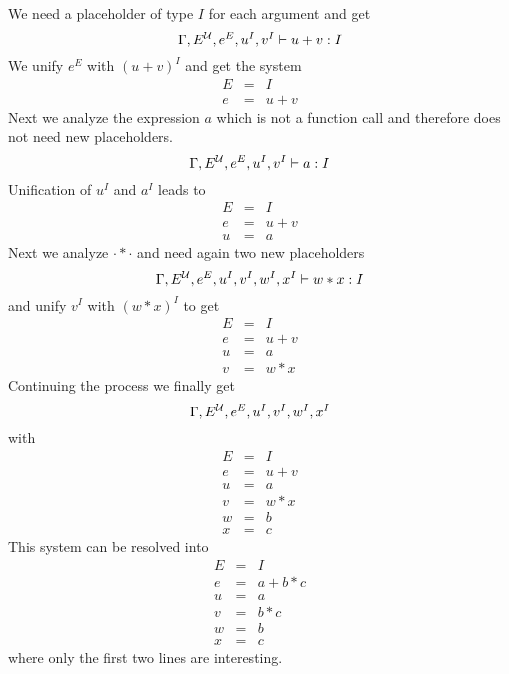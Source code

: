 We need a placeholder of type $I$ for each argument and get
$$
%
\Gamma,  E^\Any, e^E, u^I, v^I \vdash u + v: I
$$
%
We unify $e^E$ with $(u+v)^I$ and get the system
$$
%
\begin{array}{lll}
  E &=& I
  \\
  e &=& u + v
\end{array}
$$
%
Next we analyze the expression $a$ which is not a function call and therefore
does not need new placeholders.
$$
%
\Gamma,  E^\Any, e^E, u^I, v^I \vdash a:I
$$
%
Unification of $u^I$ and $a^I$ leads to
$$
%
\begin{array}{lll}
  E &=& I
  \\
  e &=& u + v
  \\
  u &=& a
\end{array}
$$
%
Next we analyze $\cdot * \cdot$ and need again two new placeholders
$$
%
\Gamma,  E^\Any, e^E, u^I, v^I, w^I, x^I \vdash w * x: I
$$
%
and unify $v^I$ with $ (w * x)^I$ to get
$$
%
\begin{array}{lll}
  E &=& I
  \\
  e &=& u + v
  \\
  u &=& a
  \\
  v &=& w * x
\end{array}
$$
%
Continuing the process we finally get
$$
%
\Gamma,  E^\Any, e^E, u^I, v^I, w^I, x^I
$$
%
with
$$
%
\begin{array}{lll}
  E &=& I
  \\
  e &=& u + v
  \\
  u &=& a
  \\
  v &=& w * x
  \\
  w &=& b
  \\
  x &=& c
\end{array}
$$
%
This system can be resolved into
$$
%
\begin{array}{lll}
  E &=& I
  \\
  e &=& a + b * c
  \\
  u &=& a
  \\
  v &=& b * c
  \\
  w &=& b
  \\
  x &=& c
\end{array}
$$
%
where only the first two lines are interesting.





